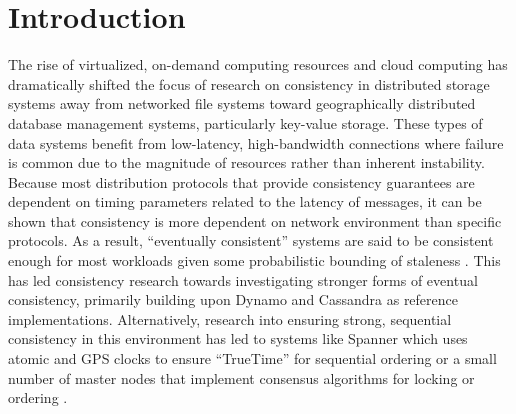 \documentclass{article}
\begin{document}
\newpage
\tableofcontents

\newpage
\listoffigures

\newpage
\doublespacing



\section{Introduction}

The rise of virtualized, on-demand computing resources and cloud computing has dramatically shifted the focus of research on consistency in distributed storage systems away from networked file systems toward geographically distributed database management systems, particularly key-value storage. These types of data systems benefit from low-latency, high-bandwidth connections where failure is common due to the magnitude of resources rather than inherent instability. Because most distribution protocols that provide consistency guarantees are dependent on timing parameters related to the latency of messages, it can be shown that consistency is more dependent on network environment than specific protocols. As a result, ``eventually consistent'' \cite{vogels_eventually_2009} systems are said to be consistent enough for most workloads given some probabilistic bounding of staleness \cite{bailis_quantifying_2014,bermbach_eventual_2011,bailis_probabilistically_2012}. This has led consistency research towards investigating stronger forms of eventual consistency, primarily building upon Dynamo \cite{decandia_dynamo:_2007} and Cassandra \cite{lakshman_cassandra:_2010} as reference implementations. Alternatively, research into ensuring strong, sequential consistency in this environment has led to systems like Spanner \cite{corbett_spanner:_2013} which uses atomic and GPS clocks to ensure ``TrueTime'' for sequential ordering or a small number of master nodes that implement consensus algorithms \cite{lamport_paxos_2001,ongaro_search_2014} for locking or ordering \cite{kraska_mdcc:_2013}.
\end{document}
